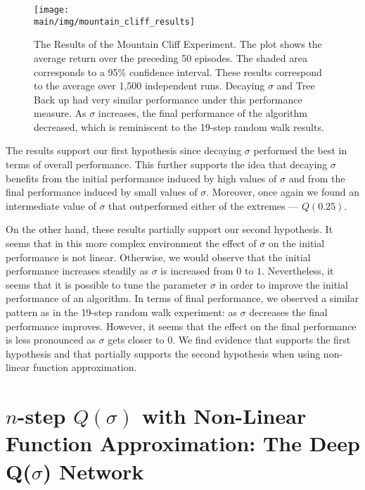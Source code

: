 \begin{figure}[t]
    \setlength{\abovecaptionskip}{0pt plus 0pt minus 0pt}
    \centering
    \texttt{[image: \\main/img/mountain\_cliff\_results]}
    \caption[The Results of the Mountain Cliff Experiment] {
    The Results of the Mountain Cliff Experiment. 
    The plot shows the average return over the preceding 50 episodes.
    The shaded area corresponds to a 95\% confidence interval.
    These results correspond to the average over 1,500 independent runs.
    Decaying $\sigma$ and Tree Back up had very similar performance under this performance measure.
    As $\sigma$ increases, the final performance of the algorithm decreased, which is reminiscent to the 19-step random walk results.
    }
    \label{fig:mountain_cliff_results}
\end{figure}

The results support our first hypothesis since decaying $\sigma$ performed the best in terms of overall performance.
This further supports the idea that decaying $\sigma$ benefits from the initial performance induced by high values of $\sigma$ and from the final performance induced by small values of $\sigma$.
Moreover, once again we found an intermediate value of $\sigma$ that outperformed either of the extremes --- $Q(0.25)$.

On the other hand, these results partially support our second hypothesis.
It seems that in this more complex environment the effect of $\sigma$ on the initial performance is not linear.
Otherwise, we would observe that the initial performance increases steadily as $\sigma$ is increased from $0$ to $1$.
Nevertheless, it seems that it is possible to tune the parameter $\sigma$ in order to improve the initial performance of an algorithm.
In terms of final performance, we observed a similar pattern as in the 19-step random walk experiment: as $\sigma$ decreases the final performance improves.
However, it seems that the effect on the final performance is less pronounced as $\sigma$ gets closer to $0$.
We find evidence that supports the first hypothesis and that partially supports the second hypothesis when using non-linear function approximation.

\section{$n$-step $Q(\sigma)$ with Non-Linear Function Approximation: The Deep Q($\sigma$) Network}
\label{sec:dqsigman}


